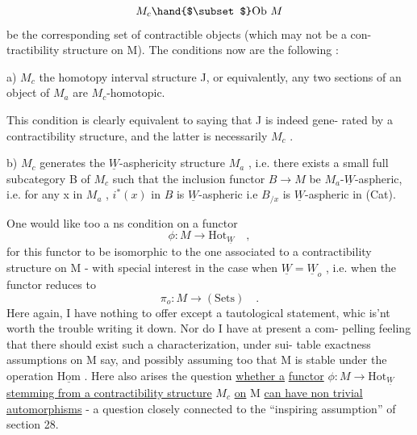 
\[ M_c \hand{$\subset$} \text{Ob } M \]
be the corresponding set of contractible objects (which may not be a con-%
tractibility structure on M). The conditions now are the following :

a) $M_c$  the homotopy interval structure J, or equivalently,
any two sections of an object of $M_a$ are $M_c$-homotopic.

This condition is clearly equivalent to saying that J is indeed gene-%
rated by a contractibility structure, and the latter is necessarily $M_c$ .

b) $M_c$ generates the $\underline{W}$-asphericity structure $M_a$ , i.e. there exists
a small full subcategory B of $M_c$ such that the inclusion functor $B \longrightarrow M$
be  $M_a$-$\underline{W}$-aspheric, i.e. for any x in $M_a$ , $i^*(x)$ in $B\hat{}$ is $\underline{W}$-aspheric \hand{(}i.e
$B_{/x}$ is $\underline{W}$-aspheric in (Cat)\hand{)}.

One would like too a ns condition on a functor
\[ \phi : M \longrightarrow \text{Hot}_{\underline{W}} \quad , \]
for this functor to be  isomorphic to the one associated to a
contractibility structure on M - with special interest in the case when
$\underline{W} = \underline{W}_o$ , i.e. when the functor reduces to 
\[ \pi_o : M \to (\text{Sets}) \quad . \]
Here again, I have nothing to offer except a tautological statement, whic
is'nt worth the trouble writing it down. Nor do I have at present a com-%
pelling feeling that there should exist such a characterization, under sui-%
table exactness assumptions on M say, and possibly assuming too that M is
stable under the operation $\underline{\text{Hom}}$ . Here also arises the question \uline{whether a}
\uline{functor} $\phi : M \longrightarrow \text{Hot}_{\underline{W}}$ \uline{stemming from a contractibility structure} $M_c$ \uline{on} M
\uline{can have non trivial automorphisms} - a question closely connected to the
``inspiring assumption'' of section 28.

